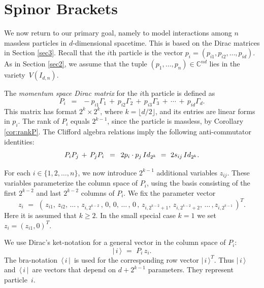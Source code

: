 \documentclass[english]{ourlematema}
\numberwithin{theorem}{section}
\theoremstyle{definition}
\newcommand{\CC}{\mathbb{C}}
\begin{document}
\section{Spinor Brackets}
\label{sec4}

We now return to our primary goal, namely to model interactions among
$n$ massless particles in $d$-dimensional spacetime. This is
based on the Dirac matrices in Section \ref{sec3}. Recall that the $i$th 
particle is the vector $p_i = (p_{i1},p_{i2},\ldots,p_{id})$.
As in Section \ref{sec2}, we assume that the tuple 
$(p_1,\ldots,p_n) \in \CC^{nd}$ lies in  the variety~$V(I_{d,n})$.
   
 The {\em momentum space Dirac matrix} for the $i$th particle is defined as
$$ P_i \,\,\,=\,\,\, -p_{i1}\Gamma_1 \,+\,   p_{i2} \Gamma_2\,+\,
p_{i3} \Gamma_3\,+\,\cdots\,+\,p_{id} \Gamma_d.
 $$
 This matrix has format $2^k \times 2^k$, where $k = \lfloor d/2 \rfloor$, 
  and its entries are linear forms in $p_i$.  The rank of $P_i$ equals $2^{k-1}$, 
  since the particle is massless, by Corollary \ref{cor:rankP}.
  The Clifford algebra relations
  imply the following anti-commutator identities:
\begin{equation}
\label{eq:cliff_to_s} 
P_i P_j \,+ \, P_j P_i \,\,\, = \,\,\, 2p_i \cdot p_j \, {\rm Id}_{2^k} \,\,=\,\,
2s_{ij} \,  {\rm Id}_{2^k}.
\end{equation}

 For each $i \in \{1,2,\ldots,n\}$, we now introduce $2^{k-1}$
additional variables $z_{ij}$.
These variables  parameterize the column space of $P_i$,
using the basis consisting of
the first $2^{k - 2}$ and last $2^{k - 2}$ columns of $P_i$.
 We fix the parameter vector
 \begin{equation}
    z_i \,\,=\,\, (\,
        z_{i1} ,\,z_{i2} ,\,\ldots \,, \,z_{i ,2^{k - 2}} \,,\,  0 ,\,0, \,\ldots \,,\, 0\, , \,z_{i ,2^{k - 2} + 1} 
        ,\,        z_{i,2^{k - 2} + 2},\,        \ldots \,, z_{i, 2^{k - 1}} \,)^T.
\end{equation}
Here it is assumed that $k \geq 2$.
In the small special case $k=1$ we set $z_i = (z_{i1},0)^T$.

We use Dirac's ket-notation for a general
vector in the column space of $P_i$:
\begin{equation}\label{eq:paramofcolumnspace}
    |\, i\, \rangle \,\,= \,\,P_i\,z_i.
\end{equation}
The bra-notation $\,\langle \, i \,|\,$
is used for the corresponding row vector $|\, i \, \rangle^T$.
Thus $|\, i\, \rangle \,$ and $\,\langle \, i \,|\, $
are vectors that depend on $d + 2^{k-1}$ parameters.
They represent  particle~$i$.
\end{document}

